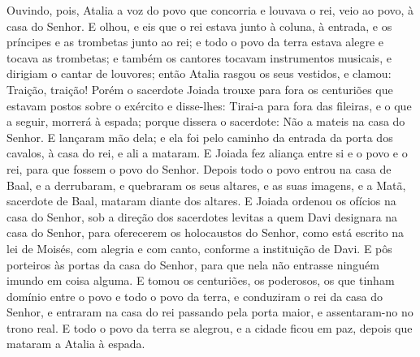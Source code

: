 Ouvindo, pois, Atalia a voz do povo que concorria e louvava o
rei, veio ao povo, à casa do Senhor. E olhou, e eis que o rei
estava junto à coluna, à entrada, e os príncipes e as trombetas
junto ao rei; e todo o povo da terra estava alegre e tocava as
trombetas; e também os cantores tocavam instrumentos musicais, e
dirigiam o cantar de louvores; então Atalia rasgou os seus vestidos,
e clamou: Traição, traição! Porém o sacerdote Joiada trouxe
para fora os centuriões que estavam postos sobre o exército e
disse-lhes: Tirai-a para fora das fileiras, e o que a seguir,
morrerá à espada; porque dissera o sacerdote: Não a mateis na casa
do Senhor. E lançaram mão dela; e ela foi pelo caminho da
entrada da porta dos cavalos, à casa do rei, e ali a mataram.
E Joiada fez aliança entre si e o povo e o rei, para que
fossem o povo do Senhor. Depois todo o povo entrou na casa de
Baal, e a derrubaram, e quebraram os seus altares, e as suas
imagens, e a Matã, sacerdote de Baal, mataram diante dos altares.
E Joiada ordenou os ofícios na casa do Senhor, sob a direção
dos sacerdotes levitas a quem Davi designara na casa do Senhor, para
oferecerem os holocaustos do Senhor, como está escrito na lei de
Moisés, com alegria e com canto, conforme a instituição de Davi.
E pôs porteiros às portas da casa do Senhor, para que nela
não entrasse ninguém imundo em coisa alguma. E tomou os
centuriões, os poderosos, os que tinham domínio entre o povo e todo
o povo da terra, e conduziram o rei da casa do Senhor, e entraram na
casa do rei passando pela porta maior, e assentaram-no no trono
real. E todo o povo da terra se alegrou, e a cidade ficou em
paz, depois que mataram a Atalia à espada.

\medskip

